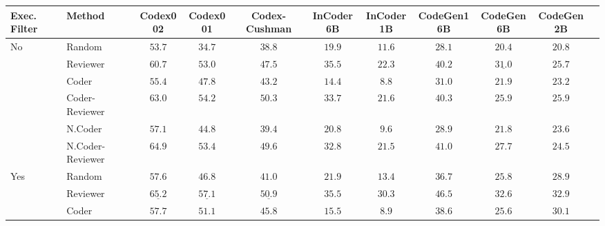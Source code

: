 \documentclass[nohyperref]{article}
\theoremstyle{plain}
\theoremstyle{definition}
\theoremstyle{remark}
\begin{document}
\begin{table*}[]
\setlength{\tabcolsep}{1.5pt}
\footnotesize
\centering
\begin{tabular}{l|lccccccccc}
\toprule
    Exec. Filter & Method &            Codex002 &            Codex001 &       Codex-Cushman &        InCoder6B &           InCoder1B &          CodeGen16B &           CodeGen6B &           CodeGen2B \\
\midrule
\multirow{6}{*}{No} & Random &              $53.7$ &              $34.7$ &              $38.8$ &           $19.9$ &              $11.6$ &              $28.1$ &              $20.4$ &              $20.8$ \\
    & Reviewer &              $60.7$ &              $53.0$ &              $47.5$ &  $\mathbf{35.5}$ &              $22.3$ &              $40.2$ &  $\underline{31.0}$ &              $25.7$ \\
\cmidrule{2-10}
    & Coder &              $55.4$ &              $47.8$ &              $43.2$ &           $14.4$ &               $8.8$ &              $31.0$ &              $21.9$ &              $23.2$ \\
    & Coder-Reviewer &              $63.0$ &              $54.2$ &              $50.3$ &           $33.7$ &              $21.6$ &              $40.3$ &              $25.9$ &              $25.9$ \\
\cmidrule{2-10}
    & N.Coder &              $57.1$ &              $44.8$ &              $39.4$ &           $20.8$ &               $9.6$ &              $28.9$ &              $21.8$ &              $23.6$ \\
    & N.Coder-Reviewer &              $64.9$ &              $53.4$ &              $49.6$ &           $32.8$ &              $21.5$ &              $41.0$ &              $27.7$ &              $24.5$ \\
\midrule
\multirow{7}{*}{Yes} & Random &              $57.6$ &              $46.8$ &              $41.0$ &           $21.9$ &              $13.4$ &              $36.7$ &              $25.8$ &              $28.9$ \\
    & Reviewer &  $\underline{65.2}$ &  $\underline{57.1}$ &  $\underline{50.9}$ &  $\mathbf{35.5}$ &     $\mathbf{30.3}$ &     $\mathbf{46.5}$ &     $\mathbf{32.6}$ &     $\mathbf{32.9}$ \\
\cmidrule{2-10}
    & Coder &              $57.7$ &              $51.1$ &              $45.8$ &           $15.5$ &               $8.9$ &              $38.6$ &              $25.6$ &              $30.1$ \\

\end{tabular}
\end{table*}
\end{document}
